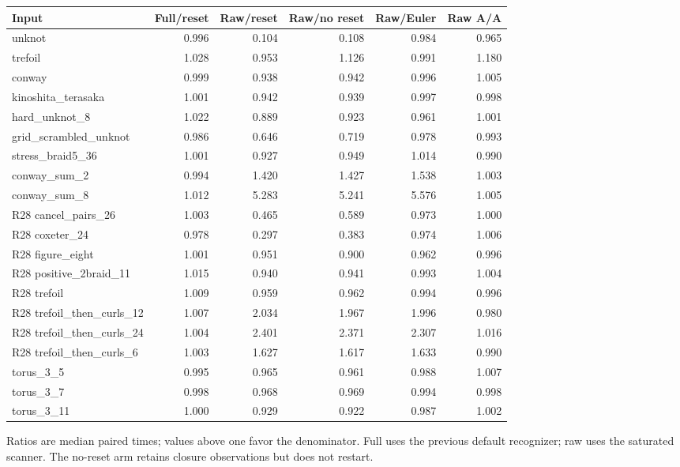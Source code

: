 \begin{center}\small
\begin{tabular}{@{}lrrrrr@{}}
\toprule
Input & Full/reset & Raw/reset & Raw/no reset & Raw/Euler & Raw A/A \\
\midrule
unknot & 0.996 & 0.104 & 0.108 & 0.984 & 0.965 \\
trefoil & 1.028 & 0.953 & 1.126 & 0.991 & 1.180 \\
conway & 0.999 & 0.938 & 0.942 & 0.996 & 1.005 \\
kinoshita\_terasaka & 1.001 & 0.942 & 0.939 & 0.997 & 0.998 \\
hard\_unknot\_8 & 1.022 & 0.889 & 0.923 & 0.961 & 1.001 \\
grid\_scrambled\_unknot & 0.986 & 0.646 & 0.719 & 0.978 & 0.993 \\
stress\_braid5\_36 & 1.001 & 0.927 & 0.949 & 1.014 & 0.990 \\
conway\_sum\_2 & 0.994 & 1.420 & 1.427 & 1.538 & 1.003 \\
conway\_sum\_8 & 1.012 & 5.283 & 5.241 & 5.576 & 1.005 \\
R28 cancel\_pairs\_26 & 1.003 & 0.465 & 0.589 & 0.973 & 1.000 \\
R28 coxeter\_24 & 0.978 & 0.297 & 0.383 & 0.974 & 1.006 \\
R28 figure\_eight & 1.001 & 0.951 & 0.900 & 0.962 & 0.996 \\
R28 positive\_2braid\_11 & 1.015 & 0.940 & 0.941 & 0.993 & 1.004 \\
R28 trefoil & 1.009 & 0.959 & 0.962 & 0.994 & 0.996 \\
R28 trefoil\_then\_curls\_12 & 1.007 & 2.034 & 1.967 & 1.996 & 0.980 \\
R28 trefoil\_then\_curls\_24 & 1.004 & 2.401 & 2.371 & 2.307 & 1.016 \\
R28 trefoil\_then\_curls\_6 & 1.003 & 1.627 & 1.617 & 1.633 & 0.990 \\
torus\_3\_5 & 0.995 & 0.965 & 0.961 & 0.988 & 1.007 \\
torus\_3\_7 & 0.998 & 0.968 & 0.969 & 0.994 & 0.998 \\
torus\_3\_11 & 1.000 & 0.929 & 0.922 & 0.987 & 1.002 \\
\bottomrule
\end{tabular}
\end{center}
Ratios are median paired times; values above one favor the denominator. Full uses the previous default recognizer; raw uses the saturated scanner. The no-reset arm retains closure observations but does not restart.
